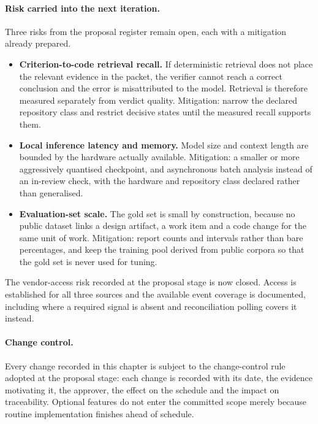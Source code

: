 \paragraph{Risk carried into the next iteration.} Three risks from the proposal
register remain open, each with a mitigation already prepared.

\begin{itemize}
  \item \textbf{Criterion-to-code retrieval recall.} If deterministic retrieval
        does not place the relevant evidence in the packet, the verifier cannot
        reach a correct conclusion and the error is misattributed to the model.
        Retrieval is therefore measured separately from verdict quality.
        Mitigation: narrow the declared repository class and restrict decisive
        states until the measured recall supports them.
  \item \textbf{Local inference latency and memory.} Model size and context
        length are bounded by the hardware actually available.
        Mitigation: a smaller or more aggressively quantised checkpoint, and
        asynchronous batch analysis instead of an in-review check, with the
        hardware and repository class declared rather than generalised.
  \item \textbf{Evaluation-set scale.} The gold set is small by construction,
        because no public dataset links a design artifact, a work item and a
        code change for the same unit of work.
        Mitigation: report counts and intervals rather than bare percentages,
        and keep the training pool derived from public corpora so that the gold
        set is never used for tuning.
\end{itemize}

The vendor-access risk recorded at the proposal stage is now closed. Access is
established for all three sources and the available event coverage is
documented, including where a required signal is absent and reconciliation
polling covers it instead.

\paragraph{Change control.} Every change recorded in this chapter is subject to
the change-control rule adopted at the proposal stage: each change is recorded
with its date, the evidence motivating it, the approver, the effect on the
schedule and the impact on traceability. Optional features do not enter the
committed scope merely because routine implementation finishes ahead of
schedule.
